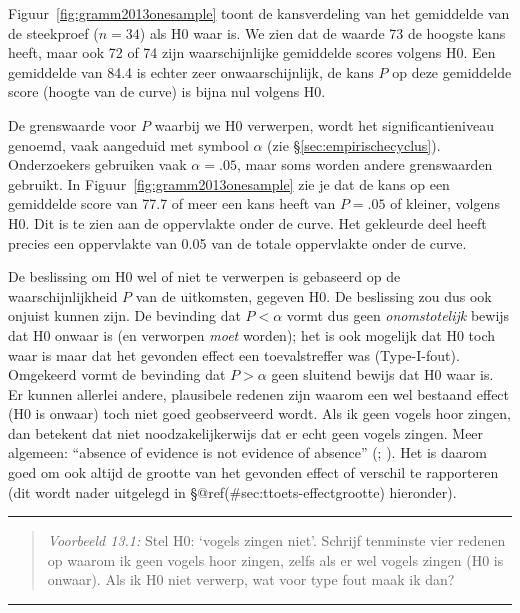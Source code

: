 \documentclass[
]{book}
\begin{document}
Figuur~\ref{fig:gramm2013onesample} toont de kansverdeling van het
gemiddelde van de steekproef (\(n=34\)) als H0 waar is. We zien dat de
waarde 73 de hoogste kans heeft, maar ook 72 of 74 zijn waarschijnlijke
gemiddelde scores volgens H0. Een gemiddelde van 84.4 is echter zeer
onwaarschijnlijk, de kans \(P\) op deze gemiddelde score (hoogte van de
curve) is bijna nul volgens H0.

De grenswaarde voor \(P\) waarbij we H0 verwerpen, wordt het
significantieniveau genoemd, vaak aangeduid met symbool \(\alpha\) (zie
§\ref{sec:empirischecyclus}). Onderzoekers gebruiken vaak
\(\alpha=.05\), maar soms worden andere grenswaarden gebruikt. In
Figuur~\ref{fig:gramm2013onesample} zie je dat de kans op een gemiddelde
score van 77.7 of meer een kans heeft van \(P=.05\) of kleiner, volgens
H0. Dit is te zien aan de oppervlakte onder de curve. Het gekleurde deel
heeft precies een oppervlakte van 0.05 van de totale oppervlakte onder
de curve.

De beslissing om H0 wel of niet te verwerpen is gebaseerd op de
waarschijnlijkheid \(P\) van de uitkomsten, gegeven H0. De beslissing zou
dus ook onjuist kunnen zijn. De bevinding dat \(P < \alpha\) vormt dus
geen \emph{onomstotelijk} bewijs dat H0 onwaar is (en verworpen \emph{moet}
worden); het is ook mogelijk dat H0 toch waar is maar dat het gevonden
effect een toevalstreffer was (Type-I-fout). Omgekeerd vormt de
bevinding dat \(P > \alpha\) geen sluitend bewijs dat H0 waar is. Er
kunnen allerlei andere, plausibele redenen zijn waarom een wel bestaand
effect (H0 is onwaar) toch niet goed geobserveerd wordt. Als ik geen
vogels hoor zingen, dan betekent dat niet noodzakelijkerwijs dat er echt
geen vogels zingen. Meer algemeen: ``absence of evidence is not evidence
of absence'' (; ). Het is daarom goed om ook altijd de grootte van het
gevonden effect of verschil te rapporteren (dit wordt nader uitgelegd in
§@ref(\#sec:ttoets-effectgrootte) hieronder).

\begin{center}\rule{0.5\linewidth}{0.5pt}\end{center}

\begin{quote}
\emph{Voorbeeld 13.1:}
Stel H0: `vogels zingen niet'. Schrijf
tenminste vier redenen op waarom ik geen vogels hoor zingen, zelfs als
er wel vogels zingen (H0 is onwaar). Als ik H0 niet verwerp, wat voor
type fout maak ik dan?
\end{quote}

\begin{center}\rule{0.5\linewidth}{0.5pt}\end{center}
\end{document}

